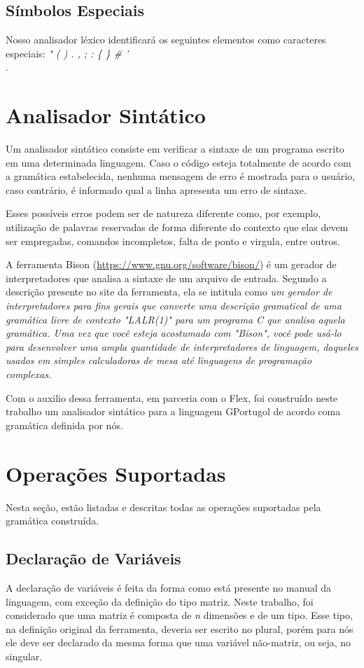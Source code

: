 \documentclass[
12pt,				%
a4paper,			%
english,			%
french,				%
spanish,			%
brazil,				%
article
]{abntex2}
\begin{document}
\subsection{Símbolos Especiais}
Nosso analisador léxico identificará os seguintes elementos como caracteres especiais: \textit{" ( ) . , ; : \{ \} \# ' \\}.


\section{Analisador Sintático}

Um analisador sintático consiste em verificar a sintaxe de um programa escrito em uma determinada linguagem. Caso o código esteja totalmente de acordo com a gramática estabelecida, nenhuma mensagem de erro é mostrada para o usuário, caso contrário, é informado qual a linha apresenta um erro de sintaxe.

Esses possíveis erros podem ser de natureza diferente como, por exemplo, utilização de palavras reservadas de forma diferente do contexto que elas devem ser empregadas, comandos incompletos, falta de ponto e virgula, entre outros. 

A ferramenta Bison (\url{https://www.gnu.org/software/bison/}) é um gerador de interpretadores que analisa a sintaxe de um arquivo de entrada. Segundo a descrição presente no site da ferramenta, ela se intitula como \textit{um gerador de interpretadores para fins gerais que converte uma descrição gramatical de uma gramática livre de contexto "LALR(1)" para um programa C que analisa aquela gramática. Uma vez que você esteja acostumado com "Bison", você pode usá-lo para desenvolver uma ampla quantidade de interpretadores de linguagem, daqueles usados em simples calculadoras de mesa até linguagens de programação complexas.}

Com o auxilio dessa ferramenta, em parceria com o Flex, foi construído neste trabalho um analisador sintático para a linguagem GPortugol de acordo coma  gramática definida por nós.


\section{Operações Suportadas}
Nesta seção, estão listadas e descritas todas as operações suportadas pela gramática construída.
\subsection{Declaração de Variáveis}
A declaração de variáveis é feita da forma como está presente no manual da linguagem, com exceção da definição do tipo matriz. Neste trabalho, foi considerado que uma matriz é composta de \textit{n} dimensões e de um tipo. Esse tipo, na definição original da ferramenta, deveria ser escrito no plural, porém para nós ele deve ser declarado da mesma forma que uma variável não-matriz, ou seja, no singular.
\end{document}
